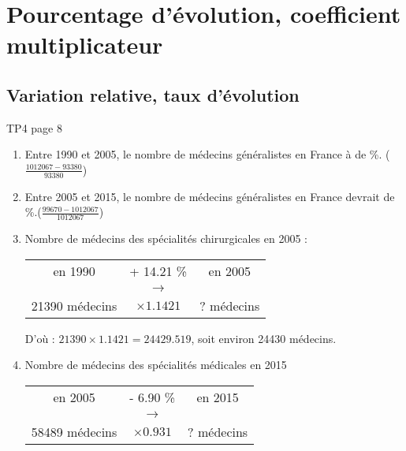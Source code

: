 \documentclass[12pt,a4paper]{article}
\begin{document}
\section{Pourcentage d'évolution, coefficient multiplicateur}

\subsection{Variation relative, taux d'évolution}

TP4 page 8

\begin{enumerate}[label=\arabic*)]
	\item Entre 1990 et 2005, le nombre de médecins généralistes en France à  de  \%. ($\frac{\num{1012067} - \num{93380}}{\num{93380}}$)
	\item Entre 2005 et 2015, le nombre de médecins généralistes en France devrait  de  \%.($\frac{\num{99670} - \num{1012067}}{\num{1012067}}$)
	
	\item Nombre de médecins des spécialités chirurgicales en 2005 : 
	
	\begin{table}[h!]
		\centering
		\begin{tabular}{|ccc|}
			\hline
			en \num{1990} & + \num{14.21} \%  & en \num{2005} \\
			& {\LARGE $\rightarrow$} &			\\
			\num{21390} médecins& $\times \num{1.1421}$ & ? médecins \\
			\hline
		\end{tabular}
	\end{table}
	
	D'où : $\num{21390} \times \num{1.1421} = \num{24429.519}$, soit environ \num{24430} médecins.
	
	\item Nombre de médecins des spécialités médicales en 2015 
	
	\begin{table}[h!]
		\centering
		\begin{tabular}{|ccc|}
			\hline
			en \num{2005} & - \num{6.90} \%  & en \num{2015} \\
			& {\LARGE $\rightarrow$} &			\\
			\num{58489} médecins& $\times \num{0.931}$ & ? médecins \\
			\hline
		\end{tabular}
	\end{table}
	

\end{enumerate}
\end{document}
